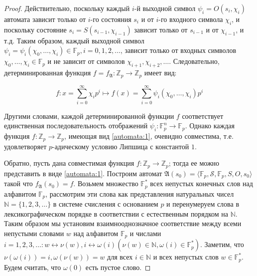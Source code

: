\documentclass[och, master]{SCWorks}
\theoremstyle{plain}
\theoremstyle{plain}
\theoremstyle{plain}
\theoremstyle{definition}
\begin{document}
\begin{proof}
Действительно, поскольку каждый $i$-й выходной символ $\psi_i = O(s_i, \chi_i)$ автомата зависит только от $i$-го состояния $s_i$ и от
$i$-го входного символа $\chi_i$, и поскольку состояние $s_i = S(s_{i-1}, \chi_{i-1})$ зависит только от $s_{i-1}$ и от $\chi_{i-1}$, и т.д. Таким образом, каждый выходной символ $\psi_i=\psi_i(\chi_0, \ldots, \chi_i) \in \mathbb F_p, i = 0,1,2,\ldots$, зависит только от входных символов $\chi_0, \ldots, \chi_i \in \mathbb F_p$ и не зависит от символов $\chi_{i+1}, \chi_{i+2}, \ldots$. Следовательно, детерминированная функция $f=f_\mathfrak{A}: \mathbb {Z}_p \rightarrow \mathbb {Z}_p$ имеет вид:

\begin{equation} \label{automata:1}
f: x = \sum_{i=0}^{\infty} \chi_{i}p^{i} \mapsto f(x) = \sum_{i=0}^{\infty}\psi_{i}(\chi_0,\ldots, \chi_i)p^i
\end{equation}

\noindent Другими словами, каждой детерминированной функции $f$ соответствует единственная последовательность отображений $\psi_i: \mathbb F^n_p\rightarrow \mathbb F_p$. Однако
каждая функция $f: \mathbb {Z}_p \rightarrow \mathbb {Z}_p$, имеющая вид \eqref{automata:1}, очевидно совместима, т.е. удовлетворяет $p$-адическому условию Липшица с константой $1$.

Обратно, пусть дана совместимая функция $f: \mathbb {Z}_p \rightarrow \mathbb {Z}_p$; тогда ее можно представить в виде \eqref{automata:1}. Построим автомат $\mathfrak{A}(s_0)=\langle\mathbb {F}_p, \mathcal{S}, \mathbb {F}_p, S, O, s_0\rangle$ такой что $f_\mathfrak{A}(s_0) = f$. Возьмем множество $\mathbb F_p^*$ всех непустых конечных слов над алфавитом $\mathbb F_p$, рассмотрим эти слова как представления натуральных чисел $\mathbb N = \{1, 2, 3, \ldots\}$ в системе счисления с основанием $p$
и перенумеруем слова в лексикографическом порядке в соответствии с
естественным порядком на $\mathbb N$. Таким образом мы установим взаимнооднозначное соответствие между всеми непустыми словами $w$ над алфавитом $\mathbb F_p$ и числами $i = 1, 2, 3, \ldots: w \leftrightarrow \nu(w), i \leftrightarrow \omega(i) (\nu(w) \in \mathbb N, \omega(i) \in \mathbb F_p^{*})$. Заметим, что $\nu(\omega(i)) = i, \omega(\nu(w)) = w$ для всех $i \in \mathbb N$ и всех непустых слов $w \in \mathbb F_p^{*}$. Будем считать, что $\omega(0)$ есть пустое слово.


\end{proof}
\end{document}
